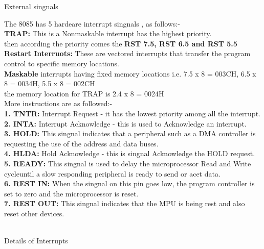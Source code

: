 \documentclass[11pt]{article}
\begin{document}
    \begin{huge}
        External singnals \\
    \end{huge}
    The 8085 has 5 hardeare interrupt singnals , as follows:- \\
    \textbf{TRAP: } This is a Nonmaskable interrupt has the highest priority.\\
    then according the priority comes the \textbf{RST 7.5, RST 6.5 and RST 5.5}\\
    \textbf{Restart Interruots: }These are vectored interrupts that transfer the program control to specific memory locations.\\
    \textbf{Maskable }interrupts having fixed memory locations i.e. 7.5 x 8 = 003CH, 6.5 x 8 = 0034H, 5.5 x 8 = 002CH \\
    the memory location for TRAP is 2.4 x 8 = 0024H\\
    More instructions are as followed:-\\
    \textbf{1. TNTR: }Interrupt Request - it has the lowest priority among all the interrupt.\\
    \textbf{2. INTA: }Interrupt Acknowledge - this is used to Acknowledge an interrupt.\\
    \textbf{3. HOLD: }This singnal indicates that a peripheral such as a DMA controller is requesting the use of the address and data buses.\\
    \textbf{4. HLDA: }Hold Acknowledge - this is singnal Acknowledge the HOLD request.\\
    \textbf{5. READY: }This singnal is used to delay the microprocessor Read and Write cycleuntil a slow responding peripheral is ready to send or acet data.\\
    \textbf{6. REST IN: }When the singnal on this pin goes low, the program controller is set to zero and the microprocessor is reset.\\
    \textbf{7. REST OUT: }This singnal indicates that the MPU is being rest and also reset other devices.\\
\\
\begin{huge}
    Details of Interrupts \\
\end{huge}
\begin{huge}

\end{huge}
\end{document}
